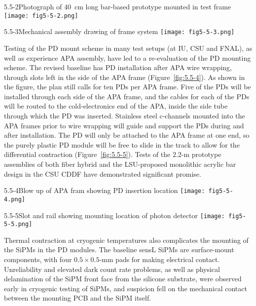 \begin{cdrfigure}{5.5-2}{Photograph of 40~cm long bar-based prototype mounted in test frame}
  \texttt{[image: fig5-5-2.png]}
\end{cdrfigure}


\begin{cdrfigure}{5.5-3}{Mechanical assembly drawing of frame system}
  \texttt{[image: fig5-5-3.png]}
\end{cdrfigure}


Testing of the PD mount scheme in many test setups (at IU, CSU and
FNAL), as well as experience APA assembly, have led to a re-evaluation
of the PD mounting scheme.  The revised baseline \fixme{} has PD installation
after APA wire wrapping, through slots left in the side
of the APA frame (Figure~\ref{fig:5.5-4}).  As shown in the figure, the
plan still calls for ten PDs per APA frame.  Five of the PDs will be
installed through each side of the APA frame, and the cables for each
of the PDs will be routed to the cold-electronics end of the APA,
inside the side tube through which the PD was inserted.  Stainless steel
c-channels mounted into the APA frames prior to wire wrapping will
guide and support the PDs during and after installation.  The PD will
only be attached to the APA frame at one end, so the purely plastic PD
module will be free to slide in the track to allow for the
differential contraction (Figure~\ref{fig:5.5-5}).  Tests of the 2.2-m prototype
assemblies of both fiber hybrid and the LSU-proposed monolithic
acrylic bar design in the CSU CDDF  have demonstrated significant
promise.  %

\begin{cdrfigure}{5.5-4}{Blow up of APA fram showing PD insertion location}
  \texttt{[image: fig5-5-4.png]}
\end{cdrfigure}


\begin{cdrfigure}{5.5-5}{Slot and rail showing mounting location of photon detector}
  \texttt{[image: fig5-5-5.png]}
\end{cdrfigure}


Thermal contraction at cryogenic temperatures also complicates the
mounting of the SiPMs in the PD modules.  The baseline \fixme{} sensL SiPMs are
surface-mount components, with four $0.5\times0.5$-mm pads for making
electrical contact.  Unreliability  and elevated dark count rate
problems, as well as physical delamination of the SiPM front face from
the silicone substrate, were observed early in cryogenic testing of
SiPMs, and suspicion fell on the mechanical contact between the
mounting PCB and the SiPM itself.

